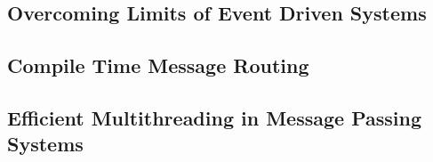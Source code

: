 \documentclass{beamer}
\begin{document}
	\subsection{Overcoming Limits of Event Driven Systems}
	\begin{frame}
		\subsectionpage
	\end{frame}
	
	\subsection{Compile Time Message Routing}
	\begin{frame}
		\subsectionpage
	\end{frame}
	
	\subsection{Efficient Multithreading in Message Passing Systems}
	\begin{frame}
		\subsectionpage
	\end{frame}
	
\end{document}
